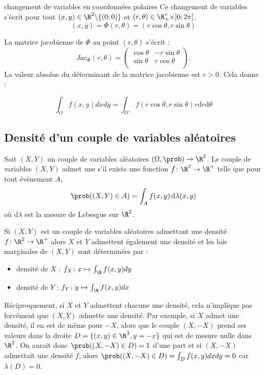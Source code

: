 	\begin{exemple}{changement de variables en coordonnées polaires}{}
		Ce changement de variables s'écrit pour tout $(x,y) \in \R^2 \backslash \{(0;0)\}$ et $(r,\theta) \in \R_+^* \times ]0;2\pi[$.
		$$(x,y)=\Phi(r,\theta)=(r\cos\theta,r\sin\theta)$$
		
		La matrice jacobienne de $\Phi$ au point $(r,\theta)$ s'écrit :
		$$Jac_{\Phi}(r,\theta) =
		\begin{pmatrix}
		\cos\theta & -r\sin\theta \\
		\sin\theta &  r\cos\theta \\
		\end{pmatrix}.$$
		La valeur absolue du déterminant de la matrice jacobienne est $r >0$. Cela donne :
		
		$$\int_{O} f(x,y)dxdy = \int_{O'} f\left(r\cos\theta,r\sin\theta\right)r\mathrm{d}r\mathrm{d}\theta$$
	\end{exemple}
	
	\subsection{Densité d'un couple de variables aléatoires}
	\begin{definition}{}{}
		Soit $(X,Y)$ un couple de variables aléatoires $(\Omega,\prob) \to \R^2$. Le couple de variables $(X,Y)$ admet une  s'il existe une fonction $f \colon \R^2 \to \R^+$ telle que pour tout événement $A$, 
		$$\prob((X,Y) \in A) = \int_A f(x,y)\,\mathrm{d}\lambda(x,y)$$
		où $\mathrm{d}\lambda$ est la mesure de Lebesgue sur $\R^2$. 
	\end{definition}
	

	
	\begin{proposition}{}{}
   Si $(X,Y)$ est un couple de variables aléatoires admettant une densité $f \colon \R^2 \to \R^+$ alors $X$ et $Y$ admettent également une densité et les lois marginales de $(X,Y)$ sont déterminées par :
	\begin{itemize}
		\item densité de $X$ : $f_X \colon x \mapsto \int_{\R}^{} f(x,y)dy$
		\item densité de $Y$ : $f_Y \colon y \mapsto\int_{\R}^{} f(x,y)dx$
	\end{itemize}
	\end{proposition}	
		
Réciproquement, si $X$ et $Y$ admettent chacune une densité, cela n'implique pas forcément que $(X,Y)$ admette une densité. Par exemple, si $X$ admet une densité, il en est de même pour $-X$, alors que le couple $(X,-X)$ prend ses valeurs dans la droite $D=\{(x,y) \in \R^2, y=-x\}$ qui est de mesure nulle dans $\R^2$. On aurait donc $\prob((X,-X) \in D) = 1$ d'une part et si $(X,-X)$ admettait une densité $f$, alors $\prob((X,-X) \in D) = \int_D f(x,y)dxdy = 0$ car $\lambda(D)=0$.
		

